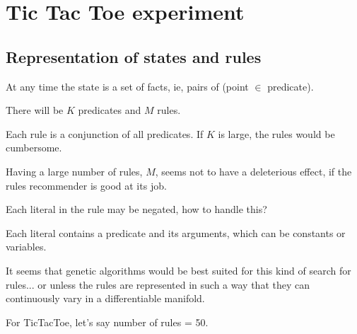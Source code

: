 \chapter{Tic Tac Toe experiment}\label{chap:TicTacToe}

\section{Representation of states and rules}

At any time the state is a set of facts, ie, pairs of (point $\in$ predicate).

There will be $K$ predicates and $M$ rules.

Each rule is a conjunction of all predicates.  If $K$ is large, the rules would be cumbersome.

Having a large number of rules, $M$, seems not to have a deleterious effect, if the rules recommender is good at its job.

Each literal in the rule may be negated, how to handle this?

Each literal contains a predicate and its arguments, which can be constants or variables.

It seems that genetic algorithms would be best suited for this kind of search for rules...  or unless the rules are represented in such a way that they can continuously vary in a differentiable manifold.

For TicTacToe, let's say number of rules = 50.

